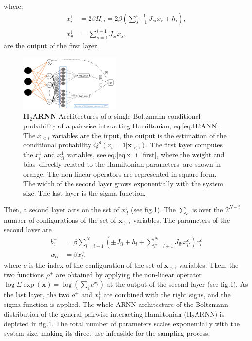 \documentclass[aps,physrev,10pt,floatfix,reprint]{revtex4-2}
\begin{document}
where:
\begin{align}
    \label{eq:x_i_first}
    x_i^1 &= 2 \beta H_{si} =  2 \beta( \sum_{s=1}^{i-1} J_{si} x_s + h_i),\\
    \label{eq:x_il_first}
    x_{il}^1 &= \sum_{s=1}^{i-1} J_{sl} x_s,
\end{align}
 are the output of the first layer. 
 \begin{figure}[!ht]
    \includegraphics[width=0.45\textwidth]{img/h2ARNN.pdf}
    \caption{ \textbf{H$_2$ARNN} Architectures of a single Boltzmann conditional probability of a pairwise interacting Hamiltonian, eq.\ref{eq:H2ANN}. The $x_{<i}$ variables are the input, the output is the estimation of the conditional probability $Q^{\theta} (x_i=1 | \mathbf{x_{<i}})$. The first layer computes the $x^1_i$ and $x^1_{il}$ variables, see eq.\ref{eq:x_i_first}, where the weight and bias, directly related to the Hamiltonian parameters, are shown in orange. The non-linear operators are represented in square form. The width of the second layer grows exponentially with the system size. The last layer is the sigma function.}
    \label{fig:arch}
\end{figure}
Then, a second layer acts on the set of $x_{il}^1$ (see fig.\ref{fig:arch}). The $\sum_{c}$ is over the $2^{N-i}$ number of configurations of the set of $\mathbf{x}_{>i}$ variables. 
The parameters of the second layer are
\begin{align}
    b_c^{\pm} &= \beta\sum_{l=i+1}^N (\pm J_{il} + h_l + \sum_{l'=l+1}^N J_{ll'}x^c_{l'}) x^c_l \\
    w_{cl} &=\beta x^c_l,
\end{align}
 where $c$ is the index of the configuration of the set of $\mathbf{x}_{>i}$ variables. Then, the two functions $\rho^{\pm}$ are obtained by applying the non-linear operator $\log \Sigma \exp (\mathbf{x}) = \log(\sum_i e^{x_i})$ at the output of the second layer (see fig.\ref{fig:arch}). 
As the last layer, the two $\rho^{\pm}$ and $x_i^1$ are combined with the right signs, and the sigma function is applied. The whole ARNN architecture of the Boltzmann distribution of the general pairwise interacting Hamiltonian ($\text{H}_2\text{ARNN}$) is depicted in fig.\ref{fig:arch}. The total number of parameters scales exponentially with the system size, making its direct use infeasible for the sampling process.
\end{document}
